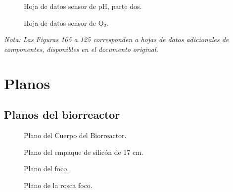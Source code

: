 \documentclass[11pt,tesis,twoside,openright,spanish]{upiiztt}
\begin{document}
\begin{figure}[H]
  \centering
  \caption{Hoja de datos sensor de pH, parte dos.}
  \label{fig:hoja_ph2}
\end{figure}

\begin{figure}[H]
  \centering
  \caption{Hoja de datos sensor de O$_2$.}
  \label{fig:hoja_o2}
\end{figure}

\noindent\textit{Nota: Las Figuras 105 a 125 corresponden a hojas de datos adicionales de componentes, disponibles en el documento original.}
\chapter{Planos}
\label{ap:planos}

\section*{Planos del biorreactor}

\begin{figure}[H]
  \centering
  \caption{Plano del Cuerpo del Biorreactor.}
  \label{fig:plano_cuerpo}
\end{figure}

\begin{figure}[H]
  \centering
  \caption{Plano del empaque de silicón de 17 cm.}
  \label{fig:plano_empaque}
\end{figure}

\begin{figure}[H]
  \centering
  \caption{Plano del foco.}
  \label{fig:plano_foco}
\end{figure}

\begin{figure}[H]
  \centering
  \caption{Plano de la rosca foco.}
  \label{fig:plano_rosca_foco}
\end{figure}
\end{document}

